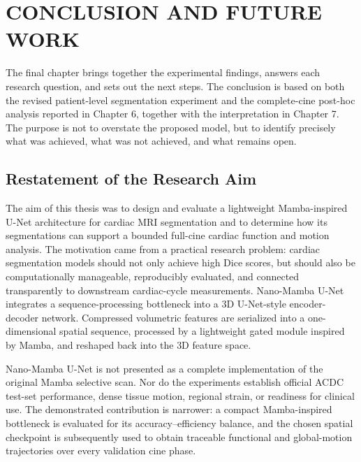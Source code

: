 
\chapter{CONCLUSION AND FUTURE WORK}
\label{chap:conclusion}

The final chapter brings together the experimental findings, answers each research question, and sets out the next steps. The conclusion is based on both the revised patient-level segmentation experiment and the complete-cine post-hoc analysis reported in Chapter 6, together with the interpretation in Chapter 7. The purpose is not to overstate the proposed model, but to identify precisely what was achieved, what was not achieved, and what remains open.

\section{Restatement of the Research Aim}
The aim of this thesis was to design and evaluate a lightweight Mamba-inspired U-Net architecture for cardiac MRI segmentation and to determine how its segmentations can support a bounded full-cine cardiac function and motion analysis. The motivation came from a practical research problem: cardiac segmentation models should not only achieve high Dice scores, but should also be computationally manageable, reproducibly evaluated, and connected transparently to downstream cardiac-cycle measurements. Nano-Mamba U-Net integrates a sequence-processing bottleneck into a 3D U-Net-style encoder-decoder network. Compressed volumetric features are serialized into a one-dimensional spatial sequence, processed by a lightweight gated module inspired by Mamba, and reshaped back into the 3D feature space.

Nano-Mamba U-Net is not presented as a complete implementation of the original Mamba selective scan. Nor do the experiments establish official ACDC test-set performance, dense tissue motion, regional strain, or readiness for clinical use. The demonstrated contribution is narrower: a compact Mamba-inspired bottleneck is evaluated for its accuracy--efficiency balance, and the chosen spatial checkpoint is subsequently used to obtain traceable functional and global-motion trajectories over every validation cine phase.

